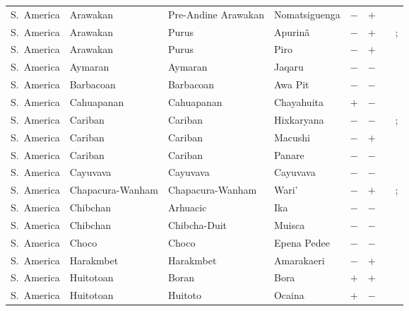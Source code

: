 \begin{landscape}
\begin{longtable}{l>{\raggedright\arraybackslash}p{2.2cm}>{\raggedright}p{2.5cm}>{\raggedright\arraybackslash}p{2.5cm}cc>{\raggedright\arraybackslash}p{3.4cm}>{\raggedright\arraybackslash}p{3.4cm}}
S.~America & Arawakan & Pre-Andine Arawakan & Nomatsiguenga & $-$ & $+$ & \citealt[262]{Derbyshire1990} & \citealt[262]{Derbyshire1990}\\
S.~America & Arawakan & Purus & Apurinã & $-$ & $+$ & \citealt{Gil2013} & \citealt{Corbett2013}; \citealt[145--148, 222--232, 348--349]{SilvaFacundes2000}\\
S.~America & Arawakan & Purus & Piro & $-$ & $+$ & \citealt{Gil2013} & \citealt[248]{Derbyshire1990}\\
S.~America & Aymaran & Aymaran & Jaqaru & $-$ & $-$ & \citealt{Gil2013} & \citealt{Corbett2013}\\
S.~America & Barbacoan & Barbacoan & Awa Pit & $-$ & $-$ & \citealt[86, 93--94]{Curnow1997} & \citealt{Corbett2013}\\
S.~America & Cahuapanan & Cahuapanan & Chayahuita & $+$ & $-$ & \citealt{Gil2013} & \citealt[258--272]{Hart1988}\\
S.~America & Cariban & Cariban & Hixkaryana & $-$ & $-$ & \citealt{Gil2013} & \citealt{Corbett2013}; \citealt[6--7]{Derbyshire1985}\\
S.~America & Cariban & Cariban & Macushi & $-$ & $+$ & \citealt[89]{Abbott1991} & \citealt[105]{Abbott1991}\\
S.~America & Cariban & Cariban & Panare & $-$ & $-$ & \citealt{Gil2013} & \citealt[263--264]{Derbyshire1990}\\
S.~America & Cayuvava & Cayuvava & Cayuvava & $-$ & $-$ & \citealt{Gil2013} & \citealt{Corbett2013}\\
S.~America & Chapacura-Wanham & Chapacura-Wanham & Wari' & $-$ & $+$ & \citealt{Gil2013} & \citealt{Corbett2013}; \citealt[2--3]{Everett1997}\\
S.~America & Chibchan & Arhuacic & Ika & $-$ & $-$ & \citealt{Gil2013} & \citealt{Corbett2013}\\
S.~America & Chibchan & Chibcha-Duit & Muisca & $-$ & $-$ & \citealt{Gil2013} & \citealt[81--108]{Adelaar2004}\\
S.~America & Choco & Choco & Epena Pedee & $-$ & $-$ & \citealt{Gil2013} & \citealt{Corbett2013}\\
S.~America & Harakmbet & Harakmbet & Amarakaeri & $-$ & $+$ & \citealt{Gil2013} & \citealt[213]{Tripp1995}\\
S.~America & Huitotoan & Boran & Bora & $+$ & $+$ & \citealt{Gil2013} & \citealt[27, 33, 36--37, 46--47]{Thiesen1996}\\
S.~America & Huitotoan & Huitoto & Ocaina & $+$ & $-$ & \citealt{Gil2013} & \citealt[257]{Derbyshire1990}\\

\end{longtable}
\end{landscape}
